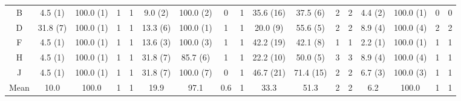 \begin{landscape}
\begin{table}
\begin{tabular}{@{}ccccccccccccccccc@{}}
      \multicolumn{1}{c|}{B}              & 4.5 (1)  & 100.0 (1) & 1    & \multicolumn{1}{c|}{1}    & 9.0 (2)                  & 100.0 (2)                & 0                        & \multicolumn{1}{c|}{1}    & 35.6 (16) & 37.5 (6)                 & 2                        & \multicolumn{1}{c|}{2}    & 4.4 (2)                  & 100.0 (1)                & 0                        & 0                        \\
      \multicolumn{1}{c|}{D}              & 31.8 (7) & 100.0 (1) & 1    & \multicolumn{1}{c|}{1}    & 13.3 (6)                 & 100.0 (1)                & 1                        & \multicolumn{1}{c|}{1}    & 20.0 (9)  & 55.6 (5)                 & 2                        & \multicolumn{1}{c|}{2}    & 8.9 (4)                  & 100.0 (4)                & 2                        & 2                        \\
      \multicolumn{1}{c|}{F}              & 4.5 (1)  & 100.0 (1) & 1    & \multicolumn{1}{c|}{1}    & 13.6 (3)                 & 100.0 (3)                & 1                        & \multicolumn{1}{c|}{1}    & 42.2 (19) & 42.1 (8)                 & 1                        & \multicolumn{1}{c|}{1}    & 2.2 (1)                  & 100.0 (1)                & 1                        & 1                        \\
      \multicolumn{1}{c|}{H}              & 4.5 (1)  & 100.0 (1) & 1    & \multicolumn{1}{c|}{1}    & 31.8 (7)                 & 85.7 (6)                 & 1                        & \multicolumn{1}{c|}{1}    & 22.2 (10) & 50.0 (5)                 & 3                        & \multicolumn{1}{c|}{3}    & 8.9 (4)                  & 100.0 (4)                & 1                        & 1                        \\
      \multicolumn{1}{c|}{J}              & 4.5 (1)  & 100.0 (1) & 1    & \multicolumn{1}{c|}{1}    & 31.8 (7)                 & 100.0 (7)                & 0                        & \multicolumn{1}{c|}{1}    & 46.7 (21) & 71.4 (15)                & 2                        & \multicolumn{1}{c|}{2}    & 6.7 (3)                  & 100.0 (3)                & 1                        & 1                        \\ \midrule
      \multicolumn{1}{l|}{Mean}           & 10.0     & 100.0     & 1    & \multicolumn{1}{c|}{1}    & 19.9                     & 97.1                     & 0.6                      & \multicolumn{1}{c|}{1}    & 33.3      & 51.3                     & 2                        & \multicolumn{1}{c|}{2}    & 6.2                      & 100.0                    & 1                        & 1                        \\

\end{tabular}
\end{table}
\end{landscape}

